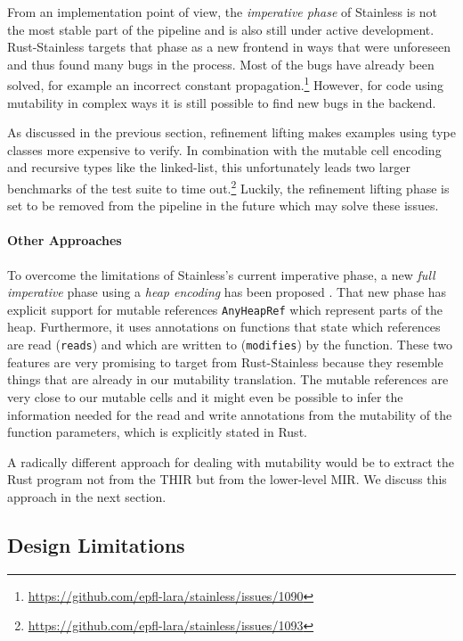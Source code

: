 From an implementation point of view, the \emph{imperative phase} of Stainless
is not the most stable part of the pipeline and is also still under active
development. Rust-Stainless targets that phase as a new frontend in ways that
were unforeseen and thus found many bugs in the process. Most of the bugs have
already been solved, for example an incorrect constant
propagation.\footnote{\url{https://github.com/epfl-lara/stainless/issues/1090}}
However, for code using mutability in complex ways it is still possible to find
new bugs in the backend.

As discussed in the previous section, refinement lifting makes examples using
type classes more expensive to verify. In combination with the mutable cell
encoding and recursive types like the linked-list, this unfortunately leads two
larger benchmarks of the test suite to time
out.\footnote{\url{https://github.com/epfl-lara/stainless/issues/1093}} Luckily,
the refinement lifting phase is set to be removed from the pipeline in the
future which may solve these issues.

\paragraph{Other Approaches}

To overcome the limitations of Stainless's current imperative phase, a
new \emph{full imperative} phase using a \emph{heap encoding} has been
proposed \cite{new-imperative}. That new phase has explicit support for
mutable references \passthrough{\lstinline!AnyHeapRef!} which represent
parts of the heap. Furthermore, it uses annotations on functions that
state which references are read (\passthrough{\lstinline!reads!}) and
which are written to (\passthrough{\lstinline!modifies!}) by the
function. These two features are very promising to target from
Rust-Stainless because they resemble things that are already in our
mutability translation. The mutable references are very close to our
mutable cells and it might even be possible to infer the information
needed for the read and write annotations from the mutability of the
function parameters, which is explicitly stated in Rust.

A radically different approach for dealing with mutability would be to
extract the Rust program not from the THIR but from the lower-level MIR.
We discuss this approach in the next section.

\subsection{Design Limitations}
\label{mir-thir}

